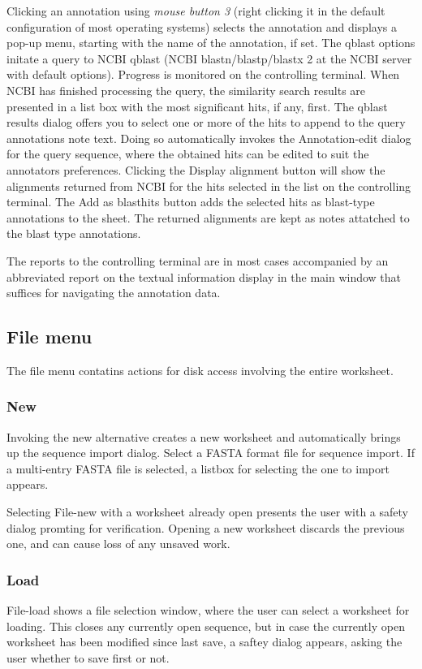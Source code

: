 Clicking an annotation using \emph{mouse button 3} (right clicking it
in the default configuration of most operating systems) selects the
annotation and displays a pop-up menu, starting with the name of the
annotation, if set. The qblast options initate a query to NCBI qblast
(NCBI blastn/blastp/blastx 2 at the NCBI server with default
options). Progress is monitored on the controlling terminal. When NCBI
has finished processing the query, the similarity search results are
presented in a list box with the most significant hits, if any,
first. The qblast results dialog offers you to select one or more of
the hits to append to the query annotations note text. Doing so
automatically invokes the Annotation-edit dialog for the query
sequence, where the obtained hits can be edited to suit the annotators
preferences. Clicking the Display alignment button will show the
alignments returned from NCBI for the hits selected in the list on the
controlling terminal.  The Add as blasthits button adds the selected
hits as blast-type annotations to the sheet. The returned alignments
are kept as notes attatched to the blast type annotations.

The reports to the controlling terminal are in most cases accompanied
by an abbreviated report on the textual information display in the
main window that suffices for navigating the annotation data.

\subsection{File menu}
The file menu contatins actions for disk access involving the entire worksheet. 

\subsubsection{New}
Invoking the new alternative creates a new worksheet and automatically
brings up the sequence import dialog. Select a FASTA format file for
sequence import. If a multi-entry FASTA file is selected, a listbox
for selecting the one to import appears.

Selecting File-new with a worksheet already open presents the user
with a safety dialog promting for verification. Opening a new
worksheet discards the previous one, and can cause loss of any unsaved
work.

\subsubsection{Load}
File-load shows a file selection window, where the user can select a
worksheet for loading. This closes any currently open sequence, but in
case the currently open worksheet has been modified since last save, a
saftey dialog appears, asking the user whether to save first or not.

